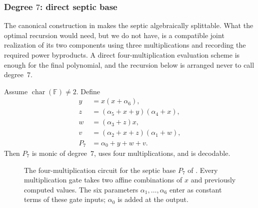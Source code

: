 \subsubsection{Degree \texorpdfstring{$7$}{7}: direct septic base}
The canonical construction in  makes the septic
algebraically splittable.  What the optimal recursion would need, but we do
not have, is a compatible joint realization of its two components using
three multiplications and recording the required power byproducts.  A direct
four-multiplication evaluation scheme is enough for the final polynomial,
and the recursion below is arranged never to call degree~$7$.

\begin{lemma}
\label{lem:septic-base}
Assume $\operatorname{char}(\mathbb F)\ne2$.  Define
\begin{align}
  y&=x(x+\alpha_6),\\
  z&=(\alpha_5+x+y)(\alpha_4+x),\\
  w&=(\alpha_3+z)x,\\
  v&=(\alpha_2+x+z)(\alpha_1+w),\\
  P_7&=\alpha_0+y+w+v.
\end{align}
Then $P_7$ is monic of degree~$7$, uses four multiplications, and is
decodable.
\end{lemma}

\begin{figure}[H]
  \centering
  \resizebox{0.95\textwidth}{!}{}
  \caption{The four-multiplication circuit for the septic base $P_7$ of .
  Every multiplication gate takes two affine combinations of $x$ and previously computed values.  The six parameters $\alpha_1,\ldots,\alpha_6$ enter as constant terms of these gate inputs; $\alpha_0$ is added at the output.}
  \label{fig:septic-circuit}
\end{figure}

